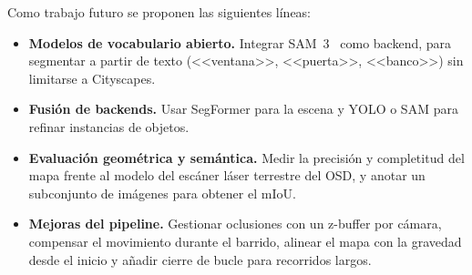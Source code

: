 \documentclass[11pt, twoside]{article}
\begin{document}
Como trabajo futuro se proponen las siguientes líneas:
\begin{itemize}[noitemsep]
  \item \textbf{Modelos de vocabulario abierto.} Integrar SAM~3~\cite{carion2025sam3} como backend, para segmentar a partir de texto (<<ventana>>, <<puerta>>, <<banco>>) sin limitarse a Cityscapes.
  \item \textbf{Fusión de backends.} Usar SegFormer para la escena y YOLO o SAM para refinar instancias de objetos.
  \item \textbf{Evaluación geométrica y semántica.} Medir la precisión y completitud del mapa frente al modelo del escáner láser terrestre del OSD, y anotar un subconjunto de imágenes para obtener el mIoU.
  \item \textbf{Mejoras del pipeline.} Gestionar oclusiones con un z-buffer por cámara, compensar el movimiento durante el barrido, alinear el mapa con la gravedad desde el inicio y añadir cierre de bucle para recorridos largos.
\end{itemize}

\nocite{*}

\end{document}
